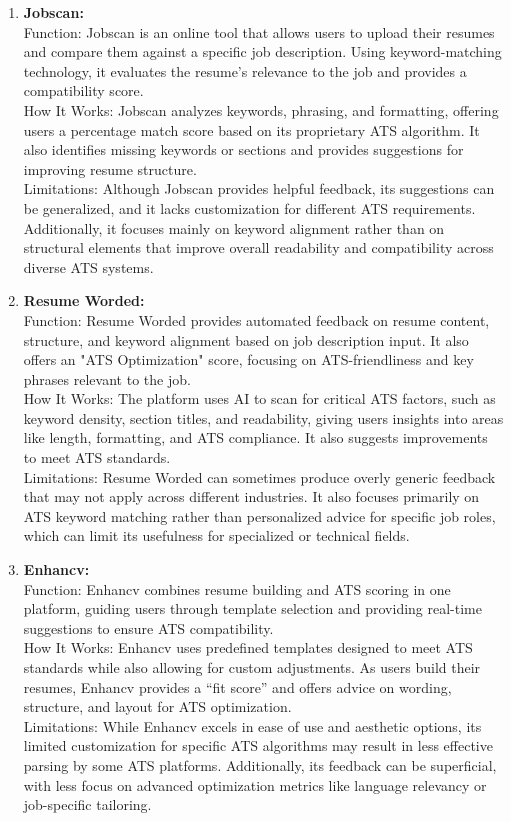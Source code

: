 \documentclass[12pt,a4paper]{report}
\begin{document}
\begin{enumerate} \item \textbf{Jobscan:}\\Function: Jobscan is an online tool that allows users to upload their resumes and compare them against a specific job description. Using keyword-matching technology, it evaluates the resume’s relevance to the job and provides a compatibility score.\\
How It Works: Jobscan analyzes keywords, phrasing, and formatting, offering users a percentage match score based on its proprietary ATS algorithm. It also identifies missing keywords or sections and provides suggestions for improving resume structure.\\
Limitations: Although Jobscan provides helpful feedback, its suggestions can be generalized, and it lacks customization for different ATS requirements. Additionally, it focuses mainly on keyword alignment rather than on structural elements that improve overall readability and compatibility across diverse ATS systems.

\item \textbf{Resume Worded:}\\Function: Resume Worded provides automated feedback on resume content, structure, and keyword alignment based on job description input. It also offers an "ATS Optimization" score, focusing on ATS-friendliness and key phrases relevant to the job.\\
How It Works: The platform uses AI to scan for critical ATS factors, such as keyword density, section titles, and readability, giving users insights into areas like length, formatting, and ATS compliance. It also suggests improvements to meet ATS standards.\\
Limitations: Resume Worded can sometimes produce overly generic feedback that may not apply across different industries. It also focuses primarily on ATS keyword matching rather than personalized advice for specific job roles, which can limit its usefulness for specialized or technical fields.

\item \textbf{Enhancv:}\\ Function: Enhancv combines resume building and ATS scoring in one platform, guiding users through template selection and providing real-time suggestions to ensure ATS compatibility.\\
How It Works: Enhancv uses predefined templates designed to meet ATS standards while also allowing for custom adjustments. As users build their resumes, Enhancv provides a “fit score” and offers advice on wording, structure, and layout for ATS optimization.\\
Limitations: While Enhancv excels in ease of use and aesthetic options, its limited customization for specific ATS algorithms may result in less effective parsing by some ATS platforms. Additionally, its feedback can be superficial, with less focus on advanced optimization metrics like language relevancy or job-specific tailoring.


\end{enumerate}
\end{document}
